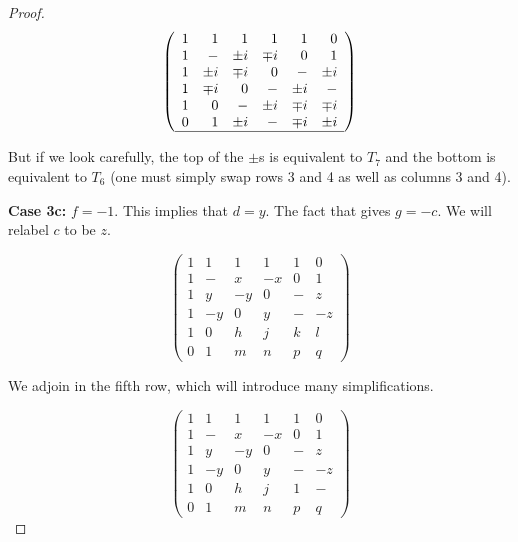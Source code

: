 \begin{lemma}
\begin{proof}
\begin{equation} \label{mat:3b-7}
\left(\begin{array}{rrrrrr}
               1 & 1 & 1 &  1 &  1 & 0 \\
               1 & - & \pm i & \mp i &  0 & 1 \\
               1 & \pm i & \mp i &  0 & - & \pm i \\
               1 & \mp i & 0 & - & \pm i & - \\
               1 & 0 & - & \pm i & \mp i & \mp i \\
               0 & 1 & \pm i & - & \mp i & \pm i \\ \hline
             \end{array}\right)
\end{equation}

But if we look carefully, the top of the $\pm$s is equivalent to $T_7$ and the bottom is equivalent to $T_6$ (one must simply swap rows 3 and 4 as well as columns 3 and 4).

{\bf Case 3c:} $f = -1$. This implies that $d = y$. The fact that  gives $g = -c$. We will relabel $c$ to be $z$.

\begin{equation} \label{mat:3c-1}
\left(\begin{array}{rrrrrr}
 1 &  1 & 1 & 1 & 1 & 0 \\
 1 &  - & x & -x & 0 & 1 \\ 
 1 &  y & -y & 0 & - & z \\
 1 &  -y & 0 & y & - & -z \\ \hline
 1 &  0 & h & j & k & l \\
 0 &  1 & m & n & p & q
\end{array}\right)
\end{equation}

We adjoin in the fifth row, which will introduce many simplifications.

\begin{equation} \label{mat:3c-2}
\left(\begin{array}{rrrrrr}
               1 & 1 & 1 &  1 &  1 & 0 \\
               1 & - & x & -x &  0 & 1 \\
               1 & y & -y &  0 & - & z \\
               1 & -y & 0 & y & - & -z \\
               1 & 0 & h & j & 1 & - \\ \hline
               0 &  1 & m & n & p & q
             \end{array}\right)
\end{equation}


\end{proof}
\end{lemma}
